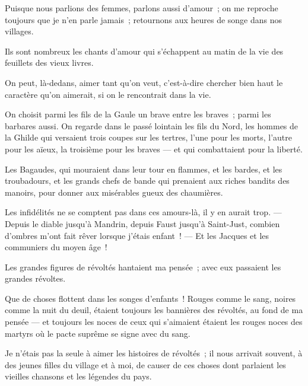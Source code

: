 \documentclass[french,twoside]{book} %
\newcommand{\astertri}{\medskip\par\centerline{\color{rubric}\large\selectfont{\syms ✻\,✻\,✻}}\medskip\par}%
\newenvironment{quoteblock}%
  {\begin{quoting}}
  {\end{quoting}}
\newcommand\chaptercont{} %
\newenvironment{quotebar}{%
    \def\FrameCommand{{\color{rubric!10!}\vrule width 0.5em} \hspace{0.9em}}%
    \def\OuterFrameSep{\itemsep} %
    \MakeFramed {\advance\hsize-\width \FrameRestore}
  }%
  {%
    \endMakeFramed
  }
\renewenvironment{quoteblock}%
  {%
    \savenotes
    \setstretch{0.9}
    \normalfont
    \begin{quotebar}
  }
  {%
    \end{quotebar}
    \spewnotes
  }
\begin{document}
\chaptercont
\noindent Puisque nous parlions des femmes, parlons aussi d’amour ; on me reproche toujours que je n’en parle jamais ; retournons aux heures de songe dans nos villages.\par
Ils sont nombreux les chants d’amour qui s’échappent au matin de la vie des feuillets des vieux livres.\par
On peut, là-dedans, aimer tant qu’on veut, c’est-à-dire chercher bien haut le caractère qu’on aimerait, si on le rencontrait dans la vie.\par
On choisit parmi les fils de la Gaule un brave entre les braves ; parmi les barbares aussi. On regarde dans le passé lointain les fils du Nord, les hommes de la Ghilde qui versaient trois coupes sur les tertres, l’une pour les morts, l’autre pour les aïeux, la troisième pour les braves — et qui combattaient pour la liberté.\par
Les Bagaudes, qui mouraient dans leur tour en flammes, et les bardes, et les troubadours, et  les grands chefs de bande qui prenaient aux riches bandits des manoirs, pour donner aux misérables gueux des chaumières.\par
Les infidélités ne se comptent pas dans ces amours-là, il y en aurait trop. — Depuis le diable jusqu’à Mandrin, depuis Faust jusqu’à Saint-Just, combien d’ombres m’ont fait rêver lorsque j’étais enfant ! — Et les Jacques et les communiers du moyen âge !\par
Les grandes figures de révoltés hantaient ma pensée ; avec eux passaient les grandes révoltes.\par
Que de choses flottent dans les songes d’enfants ! Rouges comme le sang, noires comme la nuit du deuil, étaient toujours les bannières des révoltés, au fond de ma pensée — et toujours les noces de ceux qui s’aimaient étaient les rouges noces des martyrs où le pacte suprême se signe avec du sang.\par
Je n’étais pas la seule à aimer les histoires de révoltés ; il nous arrivait souvent, à des jeunes filles du village et à moi, de causer de ces choses dont parlaient les vieilles chansons et les légendes du pays.\par

\begin{quoteblock}

\astertri

\end{quoteblock}
\end{document}
